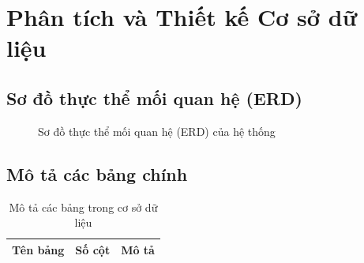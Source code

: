 
\chapter{Phân tích và Thiết kế Cơ sở dữ liệu}

\section{Sơ đồ thực thể mối quan hệ (ERD)}\label{Sec2.1}

\begin{de}\label{def2.1}

\end{de}

\begin{figure}[H]
  \centering
  \caption{Sơ đồ thực thể mối quan hệ (ERD) của hệ thống}\label{fig:erd}
\end{figure}

\section{Mô tả các bảng chính}\label{Sec2.2}


\begin{table}[H]
  \begin{center}
    \begin{tabular}{|l|c|l|}
      \hline
      \textbf{Tên bảng} & \textbf{Số cột} & \textbf{Mô tả} \\
      \hline
      \hline
      \hline
      \hline
      \hline
      \hline
    \end{tabular}
  \end{center}
  \caption{Mô tả các bảng trong cơ sở dữ liệu}\label{table:tables}
\end{table}

